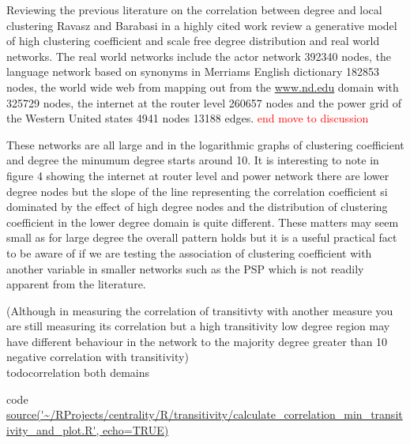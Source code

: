 Reviewing the previous literature on the correlation between degree and local clustering Ravasz and Barabasi in a highly cited work \cite{ravasz2002hierarchical} review a generative model of high clustering coefficient and scale free degree distribution and real world networks. The real world networks include the actor network 392340 nodes, the language network based on synonyms in Merriams English dictionary 182853 nodes, the world wide web from mapping out from the \url{www.nd.edu} domain with 325729 nodes, the internet at the router level 260657 nodes and the power grid of the Western United states 4941 nodes 13188 edges. \textcolor{red}{end move to discussion}

These networks are all large and in the logarithmic graphs of clustering coefficient and degree the minumum degree starts around 10. It is interesting to note in figure 4 showing the internet at router level and power network there are lower degree nodes but the slope of the line representing the correlation coefficient si dominated by the effect of high degree nodes and the distribution of clustering coefficient in the lower degree domain is quite different. These matters may seem small as for large degree the overall pattern holds but it is a useful practical fact to be aware of if we are testing the association of clustering coefficient with another variable in smaller networks such as the PSP which is not readily apparent from the literature.

(Although in measuring the correlation of transitivty with another measure you are still measuring its correlation but a high transitivity low degree region may have different behaviour in the network to the majority degree greater than 10 negative correlation with transitivity)\\todo{correlation both demains}

code \url{source('~/RProjects/centrality/R/transitivity/calculate_correlation_min_transitivity_and_plot.R', echo=TRUE)}

